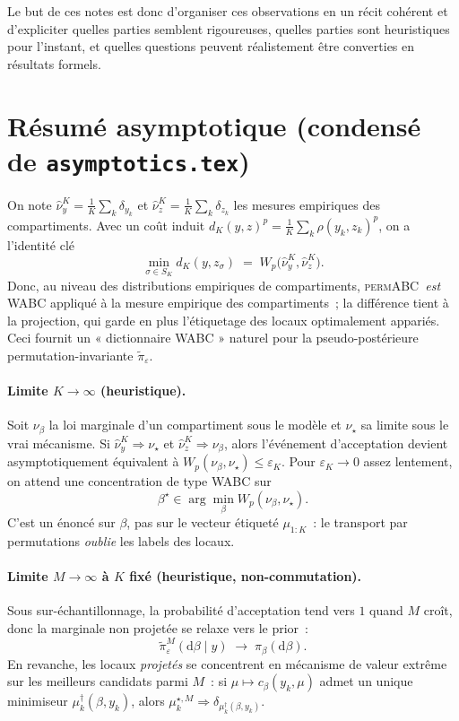 \documentclass[11pt]{article}
\newcommand{\permABC}{\textsc{permABC}}
\begin{document}
Le but de ces notes est donc d'organiser ces observations en un récit cohérent et d'expliciter
quelles parties semblent rigoureuses, quelles parties sont heuristiques pour l'instant, et
quelles questions peuvent réalistement être converties en résultats formels.

\section{Résumé asymptotique (condensé de \texttt{asymptotics.tex})}
\label{sec:asympt_short}

On note $\widehat\nu_y^K = \tfrac1K\sum_k \delta_{y_k}$ et $\widehat\nu_z^K = \tfrac1K\sum_k \delta_{z_k}$ les
mesures empiriques des compartiments. Avec un coût induit
$d_K(y,z)^p = \tfrac1K\sum_k \rho(y_k,z_k)^p$, on a l'identité clé
\[
  \min_{\sigma\in S_K} d_K(y,z_\sigma) \;=\; W_p\bigl(\widehat\nu_y^K,\widehat\nu_z^K\bigr).
\]
Donc, au niveau des distributions empiriques de compartiments, \permABC\ \emph{est} WABC appliqué
à la mesure empirique des compartiments~; la différence tient à la projection, qui garde en plus
l'étiquetage des locaux optimalement appariés. Ceci fournit un « dictionnaire WABC » naturel pour
la pseudo-postérieure permutation-invariante $\tilde\pi_\varepsilon$.

\paragraph{Limite $K\to\infty$ (heuristique).} Soit $\nu_\beta$ la loi marginale d'un compartiment sous
le modèle et $\nu_\star$ sa limite sous le vrai mécanisme. Si $\widehat\nu_y^K\Rightarrow\nu_\star$
et $\widehat\nu_z^K\Rightarrow\nu_\beta$, alors l'événement d'acceptation devient
asymptotiquement équivalent à $W_p(\nu_\beta,\nu_\star)\le\varepsilon_K$. Pour $\varepsilon_K\to0$
assez lentement, on attend une concentration de type WABC sur
\[
  \beta^\star \in \arg\min_\beta W_p(\nu_\beta,\nu_\star).
\]
C'est un énoncé sur $\beta$, pas sur le vecteur étiqueté $\mu_{1:K}$~: le transport par
permutations \emph{oublie} les labels des locaux.

\paragraph{Limite $M\to\infty$ à $K$ fixé (heuristique, non-commutation).} Sous
sur-échantillonnage, la probabilité d'acceptation tend vers $1$ quand $M$ croît, donc la marginale
non projetée se relaxe vers le prior~:
\[
  \tilde\pi_\varepsilon^{M}(\mathrm d\beta\mid y)\;\longrightarrow\;\pi_\beta(\mathrm d\beta).
\]
En revanche, les locaux \emph{projetés} se concentrent en mécanisme de valeur extrême sur les
meilleurs candidats parmi $M$~: si $\mu\mapsto c_\beta(y_k,\mu)$ admet un unique minimiseur
$\mu_k^\dagger(\beta,y_k)$, alors $\mu_k^{\star,M}\Rightarrow\delta_{\mu_k^\dagger(\beta,y_k)}$.
\end{document}
